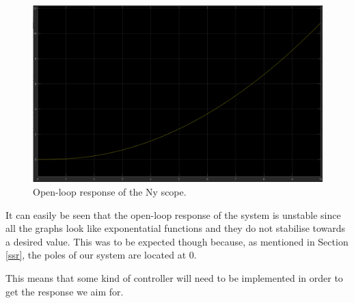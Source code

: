 \begin{figure}[H]
  \centering
    \includegraphics[width=1\textwidth]{images/Ny.png}
	\caption{Open-loop response of the Ny scope.}
	\label{openloop5}
\end{figure}

It can easily be seen that the open-loop response of the system is unstable since all the graphs look like exponentatial functions and they do not stabilise towards a desired value. This was to be expected though because, as mentioned in Section \ref{ssr}, the poles of our system are located at 0. 

This means that some kind of controller will need to be implemented in order to get the response we aim for.